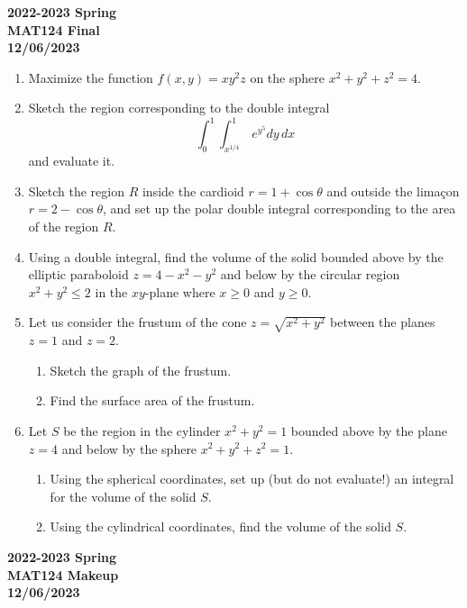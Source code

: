 \documentclass[a4paper, 12pt]{article}
\begin{document}
\newpage
{}
{}
\begin{center}
\textbf{2022-2023 Spring \\MAT124 Final\\12/06/2023}
\end{center}

\begin{enumerate}[leftmargin=*,label=\textbf{\arabic*.}]
\item Maximize the function $f(x,y)=xy^2z$ on the sphere $x^2+y^2+z^2 = 4$.

\item Sketch the region corresponding to the double integral
\[\int_0^1\int_{x^{1/4}}^1\,{e}^{y^5}dy\,dx\]
and evaluate it.

\item Sketch the region $R$ inside the cardioid $r=1+\cos\theta$ and outside the limaçon $r=2-\cos\theta$, and set up the polar double integral corresponding to the area of the region $R$.

\item Using a double integral, find the volume of the solid bounded above by the elliptic paraboloid $z=4-x^2-y^2$ and below by the circular region $x^2+y^2\leq2$ in the $xy$-plane where $x\geq0$ and $y\geq0$.

\item Let us consider the frustum of the cone $z=\sqrt{x^2+y^2}$ between the planes $z=1$ and $z=2$.

\begin{enumerate}[leftmargin=*,label=\textbf{\alph*.}]
\item Sketch the graph of the frustum.
\item Find the surface area of the frustum.
\end{enumerate}

\item Let $S$ be the region in the cylinder $x^2+y^2 = 1$ bounded above by the plane $z=4$ and below by the sphere $x^2+y^2+z^2=1$.
\begin{enumerate}[leftmargin=*,label=\textbf{\alph*.}]
\item Using the spherical coordinates, set up (but do not evaluate!) an integral for the volume of the solid $S$.
\item Using the cylindrical coordinates, find the volume of the solid $S$.
\end{enumerate}
\end{enumerate}
\newpage
{}
{}
\begin{center}
\textbf{2022-2023 Spring \\MAT124 Makeup\\12/06/2023}
\end{center}
\end{document}
